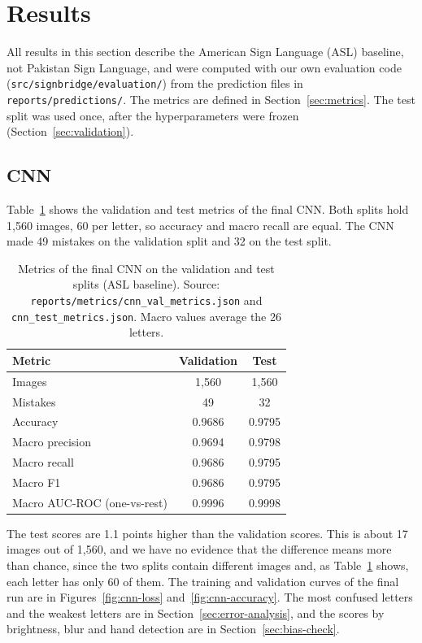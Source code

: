 \section{Results}
\label{sec:results}

All results in this section describe the American Sign Language (ASL) baseline, not Pakistan Sign Language, and were computed with our own evaluation code (\texttt{src/signbridge/evaluation/}) from the prediction files in \texttt{reports/predictions/}. The metrics are defined in Section~\ref{sec:metrics}. The test split was used once, after the hyperparameters were frozen (Section~\ref{sec:validation}).

\subsection{CNN}

Table~\ref{tab:cnn-results} shows the validation and test metrics of the final CNN. Both splits hold 1{,}560 images, 60 per letter, so accuracy and macro recall are equal. The CNN made 49 mistakes on the validation split and 32 on the test split.

\begin{table}[htbp]
  \centering
  \caption{Metrics of the final CNN on the validation and test splits (ASL baseline). Source: \texttt{reports/metrics/cnn\_val\_metrics.json} and \texttt{cnn\_test\_metrics.json}. Macro values average the 26 letters.}
  \label{tab:cnn-results}
  \begin{tabular}{lcc}
    \toprule
    Metric & Validation & Test \\
    \midrule
    Images & 1{,}560 & 1{,}560 \\
    Mistakes & 49 & 32 \\
    Accuracy & 0.9686 & 0.9795 \\
    Macro precision & 0.9694 & 0.9798 \\
    Macro recall & 0.9686 & 0.9795 \\
    Macro F1 & 0.9686 & 0.9795 \\
    Macro AUC-ROC (one-vs-rest) & 0.9996 & 0.9998 \\
    \bottomrule
  \end{tabular}
\end{table}

The test scores are 1.1 points higher than the validation scores. This is about 17 images out of 1{,}560, and we have no evidence that the difference means more than chance, since the two splits contain different images and, as Table~\ref{tab:cnn-results} shows, each letter has only 60 of them. The training and validation curves of the final run are in Figures~\ref{fig:cnn-loss} and~\ref{fig:cnn-accuracy}. The most confused letters and the weakest letters are in Section~\ref{sec:error-analysis}, and the scores by brightness, blur and hand detection are in Section~\ref{sec:bias-check}.

